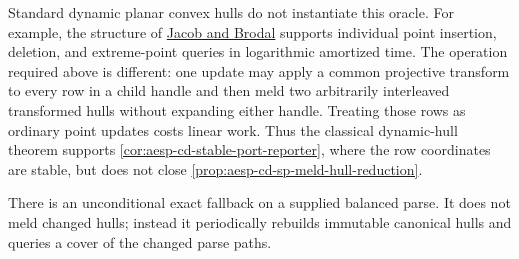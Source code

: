 Standard dynamic planar convex hulls do not instantiate this oracle.  For
example, the structure of
\href{https://arxiv.org/abs/1902.11169}{Jacob and Brodal} supports individual
point insertion, deletion, and extreme-point queries in logarithmic
amortized time.  The operation required above is different: one update may
apply a common projective transform to every row in a child handle and then
meld two arbitrarily interleaved transformed hulls without expanding either
handle.  Treating those rows as ordinary point updates costs linear work.
Thus the classical dynamic-hull theorem supports
\cref{cor:aesp-cd-stable-port-reporter}, where the row coordinates are stable,
but does not close \cref{prop:aesp-cd-sp-meld-hull-reduction}.

There is an unconditional exact fallback on a supplied balanced parse.  It
does not meld changed hulls; instead it periodically rebuilds immutable
canonical hulls and queries a cover of the changed parse paths.

